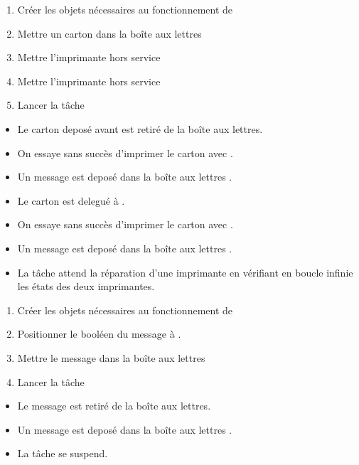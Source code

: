 {
\begin{enumerate}
	\item Créer les objets nécessaires au fonctionnement de 
	\item Mettre un carton dans la boîte aux lettres 
	\item Mettre l'imprimante  hors service
	\item Mettre l'imprimante  hors service 
	\item Lancer la tâche 
\end{enumerate}
}
{
\begin{itemize}
	\item Le carton deposé avant est retiré de la boîte aux lettres.
	\item On essaye sans succès d'imprimer le carton avec .
	\item Un message  est deposé dans la boîte aux lettres .
	\item Le carton est delegué à .
	\item On essaye sans succès d'imprimer le carton avec .
	\item Un message  est deposé dans la boîte aux lettres .
	\item La tâche attend la réparation d'une imprimante en vérifiant en boucle infinie les états des deux imprimantes.
\end{itemize}
}

{
\begin{enumerate}
	\item Créer les objets nécessaires au fonctionnement de 
	\item Positionner le booléen  du message à .
	\item Mettre le message dans la boîte aux lettres 
	\item Lancer la tâche 
\end{enumerate}
}
{
\begin{itemize}
	\item Le message est retiré de la boîte aux lettres.
	\item Un message  est deposé dans la boîte aux lettres . 
	\item La tâche se suspend.
\end{itemize}
}

